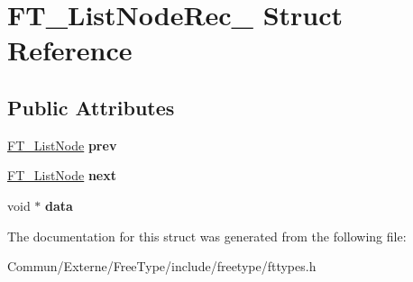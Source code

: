 \hypertarget{struct_f_t___list_node_rec__}{}\section{F\+T\+\_\+\+List\+Node\+Rec\+\_\+ Struct Reference}
\label{struct_f_t___list_node_rec__}
\subsection*{Public Attributes}
\begin{DoxyCompactItemize}
\item 
\hyperlink{struct_f_t___list_node_rec__}{F\+T\+\_\+\+List\+Node} {\bfseries prev}\hypertarget{struct_f_t___list_node_rec___a41c77950e6940b1b98e04709b705c046}{}\label{struct_f_t___list_node_rec___a41c77950e6940b1b98e04709b705c046}

\item 
\hyperlink{struct_f_t___list_node_rec__}{F\+T\+\_\+\+List\+Node} {\bfseries next}\hypertarget{struct_f_t___list_node_rec___a8275962fa8c92b77435cb4fa76251f39}{}\label{struct_f_t___list_node_rec___a8275962fa8c92b77435cb4fa76251f39}

\item 
void $\ast$ {\bfseries data}\hypertarget{struct_f_t___list_node_rec___ab0202be88f722442a4bec9aeb5f6418f}{}\label{struct_f_t___list_node_rec___ab0202be88f722442a4bec9aeb5f6418f}

\end{DoxyCompactItemize}


The documentation for this struct was generated from the following file\+:\begin{DoxyCompactItemize}
\item 
Commun/\+Externe/\+Free\+Type/include/freetype/fttypes.\+h\end{DoxyCompactItemize}

